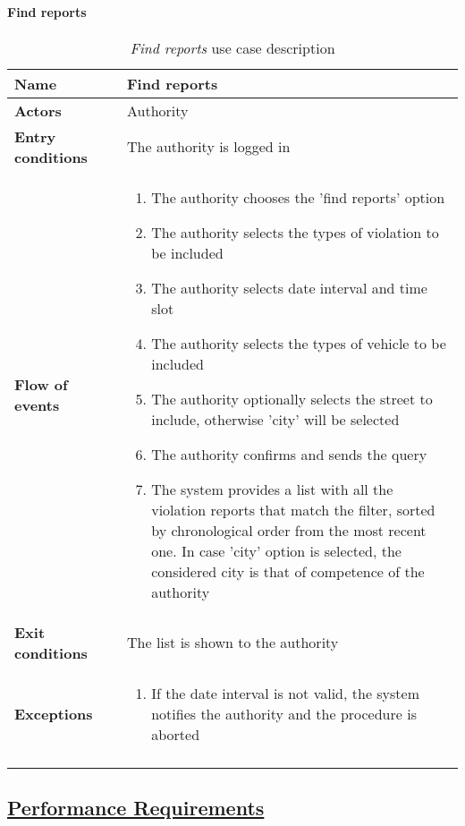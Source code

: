 		\paragraph{Find reports}
	\begin{longtable}{p{0.25\linewidth}p{0.75\linewidth}}
		\toprule
		\textbf{Name} & \textbf{Find reports} \\
		\midrule
		\textbf{Actors} & Authority\\
		\midrule
		\textbf{Entry conditions} & The authority is logged in \\
		\midrule
		\textbf{Flow of events} & 
		\begin{enumerate}
			\item The authority chooses the 'find reports' option
			\item The authority selects the types of violation to be included
			\item The authority selects date interval and time slot
			\item The authority selects the types of vehicle to be included
			\item The authority optionally selects the street to include, otherwise 'city' will be selected
			\item The authority confirms and sends the query
			\item The system provides a list with all the violation reports that match the filter, sorted by chronological order from the most recent one. In case 'city' option is selected, the considered city is that of competence of the authority
		\end{enumerate} \\
		\midrule
		\textbf{Exit conditions} & The list is shown to the authority\\
		\midrule
		\textbf{Exceptions} &  
		\begin{enumerate}
			\item If the date interval is not valid, the system notifies the authority and the procedure is aborted
		\end{enumerate}\\
		\bottomrule
		\caption{\emph{Find reports} use case description}
	\end{longtable}
	
		
	
	
\subsection[Performance Requirements]{\hyperlink{toc}{Performance Requirements}}

